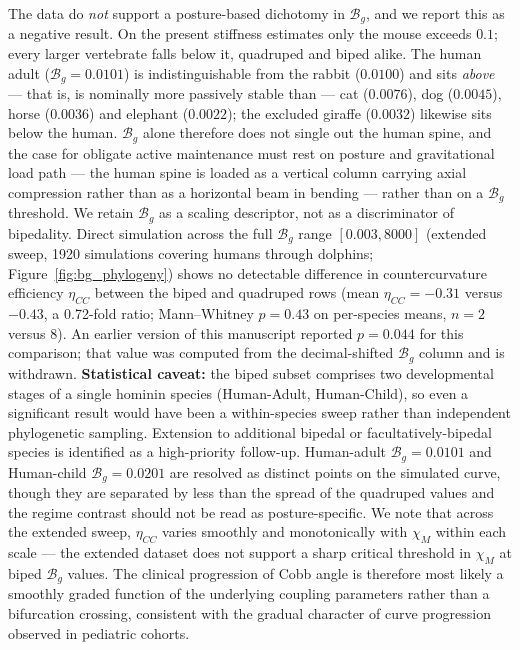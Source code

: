 The data do \emph{not} support a posture-based dichotomy in $\mathcal{B}_g$, and we report this as a negative result. On the present stiffness estimates only the mouse exceeds $0.1$; every larger vertebrate falls below it, quadruped and biped alike. The human adult ($\mathcal{B}_g = 0.0101$) is indistinguishable from the rabbit ($0.0100$) and sits \emph{above} --- that is, is nominally more passively stable than --- cat ($0.0076$), dog ($0.0045$), horse ($0.0036$) and elephant ($0.0022$); the excluded giraffe ($0.0032$) likewise sits below the human. $\mathcal{B}_g$ alone therefore does not single out the human spine, and the case for obligate active maintenance must rest on posture and gravitational load path --- the human spine is loaded as a vertical column carrying axial compression rather than as a horizontal beam in bending --- rather than on a $\mathcal{B}_g$ threshold. We retain $\mathcal{B}_g$ as a scaling descriptor, not as a discriminator of bipedality. Direct simulation across the full $\mathcal{B}_g$ range $[0.003, 8000]$ (extended sweep, 1920 simulations covering humans through dolphins; Figure~\ref{fig:bg_phylogeny}) shows no detectable difference in countercurvature efficiency $\eta_{CC}$ between the biped and quadruped rows (mean $\eta_{CC} = -0.31$ versus $-0.43$, a 0.72-fold ratio; Mann--Whitney $p = 0.43$ on per-species means, $n = 2$ versus $8$). An earlier version of this manuscript reported $p = 0.044$ for this comparison; that value was computed from the decimal-shifted $\mathcal{B}_g$ column and is withdrawn. \textbf{Statistical caveat:} the biped subset comprises two developmental stages of a single hominin species (Human-Adult, Human-Child), so even a significant result would have been a within-species sweep rather than independent phylogenetic sampling. Extension to additional bipedal or facultatively-bipedal species is identified as a high-priority follow-up. Human-adult $\mathcal{B}_g = 0.0101$ and Human-child $\mathcal{B}_g = 0.0201$ are resolved as distinct points on the simulated curve, though they are separated by less than the spread of the quadruped values and the regime contrast should not be read as posture-specific. We note that across the extended sweep, $\eta_{CC}$ varies smoothly and monotonically with $\chi_M$ within each scale --- the extended dataset does not support a sharp critical threshold in $\chi_M$ at biped $\mathcal{B}_g$ values. The clinical progression of Cobb angle is therefore most likely a smoothly graded function of the underlying coupling parameters rather than a bifurcation crossing, consistent with the gradual character of curve progression observed in pediatric cohorts.

